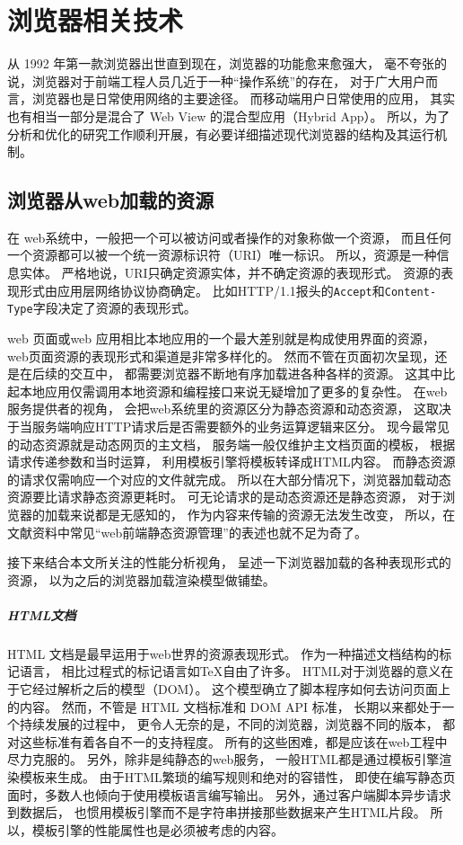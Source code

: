 \section{浏览器相关技术}

从 1992 年第一款浏览器出世直到现在，浏览器的功能愈来愈强大，
毫不夸张的说，浏览器对于前端工程人员几近于一种``操作系统''的存在，
对于广大用户而言，浏览器也是日常使用网络的主要途径。
而移动端用户日常使用的应用，
其实也有相当一部分是混合了 Web View 的混合型应用（Hybrid App）。
所以，为了分析和优化的研究工作顺利开展，有必要详细描述现代浏览器的结构及其运行机制。

\subsection{浏览器从web加载的资源}
在 web系统中，一般把一个可以被访问或者操作的对象称做一个资源，
而且任何一个资源都可以被一个统一资源标识符（URI）唯一标识。
所以，资源是一种信息实体。
严格地说，URI只确定资源实体，并不确定资源的表现形式。
资源的表现形式由应用层网络协议协商确定。
比如HTTP/1.1报头的\texttt{Accept}和\texttt{Content-Type}字段决定了资源的表现形式。

web 页面或web 应用相比本地应用的一个最大差别就是构成使用界面的资源，
web页面资源的表现形式和渠道是非常多样化的。
然而不管在页面初次呈现，还是在后续的交互中，
都需要浏览器不断地有序加载进各种各样的资源。
这其中比起本地应用仅需调用本地资源和编程接口来说无疑增加了更多的复杂性。
在web服务提供者的视角，
会把web系统里的资源区分为静态资源和动态资源，
这取决于当服务端响应HTTP请求后是否需要额外的业务运算逻辑来区分。
现今最常见的动态资源就是动态网页的主文档，
服务端一般仅维护主文档页面的模板，
根据请求传递参数和当时运算，
利用模板引擎将模板转译成HTML内容。
而静态资源的请求仅需响应一个对应的文件就完成。
所以在大部分情况下，浏览器加载动态资源要比请求静态资源更耗时\cite{souders_high_2007, souders_even_2009}。
可无论请求的是动态资源还是静态资源，
对于浏览器的加载来说都是无感知的，
作为内容来传输的资源无法发生改变，
所以，在文献资料中常见``web前端静态资源管理''的表述也就不足为奇了。

接下来结合本文所关注的性能分析视角，
呈述一下浏览器加载的各种表现形式的资源，
以为之后的浏览器加载渲染模型做铺垫。

	\subparagraph{HTML文档}
    HTML 文档是最早运用于web世界的资源表现形式。
    作为一种描述文档结构的标记语言，
    相比过程式的标记语言如\TeX 自由了许多。
    HTML对于浏览器的意义在于它经过解析之后的模型（DOM）。
    这个模型确立了脚本程序如何去访问页面上的内容。
    然而，不管是 HTML 文档标准和 DOM API 标准，
    长期以来都处于一个持续发展的过程中，
    更令人无奈的是，不同的浏览器，浏览器不同的版本，
    都对这些标准有着各自不一的支持程度。
    所有的这些困难，都是应该在web工程中尽力克服的。
    另外，除非是纯静态的web服务，
    一般HTML都是通过模板引擎渲染模板来生成。
    由于HTML繁琐的编写规则和绝对的容错性，
    即使在编写静态页面时，多数人也倾向于使用模板语言编写输出。
    另外，通过客户端脚本异步请求到数据后，
    也惯用模板引擎而不是字符串拼接那些数据来产生HTML片段。
    所以，模板引擎的性能属性也是必须被考虑的内容。

